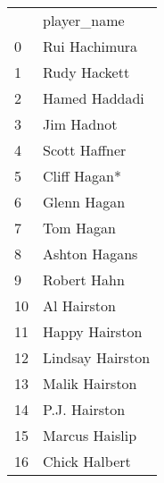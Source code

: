 \begin{tabular}{ll}

{} &       player\_name \\

0  &     Rui Hachimura \\
1  &      Rudy Hackett \\
2  &     Hamed Haddadi \\
3  &        Jim Hadnot \\
4  &     Scott Haffner \\
5  &      Cliff Hagan* \\
6  &       Glenn Hagan \\
7  &         Tom Hagan \\
8  &     Ashton Hagans \\
9  &       Robert Hahn \\
10 &       Al Hairston \\
11 &    Happy Hairston \\
12 &  Lindsay Hairston \\
13 &    Malik Hairston \\
14 &     P.J. Hairston \\
15 &    Marcus Haislip \\
16 &     Chick Halbert \\

\end{tabular}
